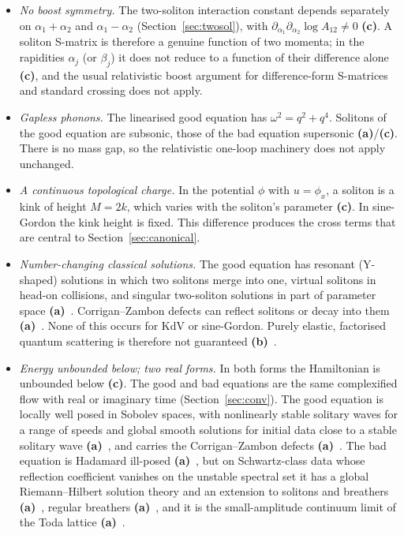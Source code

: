 \documentclass[11pt,a4paper]{article}
\newcommand{\lab}[1]{{\normalfont\sffamily\footnotesize\bfseries(#1)}}
\newcommand{\La}{\lab{a}}
\newcommand{\Lb}{\lab{b}}
\newcommand{\Lc}{\lab{c}}
\theoremstyle{remark}
\begin{document}
\begin{itemize}
\item \emph{No boost symmetry.} The two-soliton interaction constant depends separately on $\alpha_1+\alpha_2$ and $\alpha_1-\alpha_2$ (Section~\ref{sec:twosol}), with $\partial_{\alpha_1}\partial_{\alpha_2}\log A_{12}\neq0$ \Lc. A soliton S-matrix is therefore a genuine function of two momenta; in the rapidities $\alpha_j$ (or $\beta_j$) it does not reduce to a function of their difference alone \Lc, and the usual relativistic boost argument for difference-form S-matrices and standard crossing does not apply.
\item \emph{Gapless phonons.} The linearised good equation has $\omega^2=q^2+q^4$. Solitons of the good equation are subsonic, those of the bad equation supersonic \La/\Lc. There is no mass gap, so the relativistic one-loop machinery does not apply unchanged.
\item \emph{A continuous topological charge.} In the potential $\phi$ with $u=\phi_x$, a soliton is a kink of height $M=2k$, which varies with the soliton's parameter \Lc. In sine-Gordon the kink height is fixed. This difference produces the cross terms that are central to Section~\ref{sec:canonical}.
\item \emph{Number-changing classical solutions.} The good equation has resonant (Y-shaped) solutions in which two solitons merge into one, virtual solitons in head-on collisions, and singular two-soliton solutions in part of parameter space \La~\cite{HI,LMK,RS,DMHC}. Corrigan--Zambon defects can reflect solitons or decay into them \La~\cite{CZ}. None of this occurs for KdV or sine-Gordon. Purely elastic, factorised quantum scattering is therefore not guaranteed \Lb~\cite{CZ}.
\item \emph{Energy unbounded below; two real forms.} In both forms the Hamiltonian is unbounded below \Lc. The good and bad equations are the same complexified flow with real or imaginary time (Section~\ref{sec:conv}). The good equation is locally well posed in Sobolev spaces, with nonlinearly stable solitary waves for a range of speeds and global smooth solutions for initial data close to a stable solitary wave \La~\cite{BonaSachs}, and carries the Corrigan--Zambon defects \La~\cite{CZ}. The bad equation is Hadamard ill-posed \La~\cite{CL-WW}, but on Schwartz-class data whose reflection coefficient vanishes on the unstable spectral set it has a global Riemann--Hilbert solution theory and an extension to solitons and breathers \La~\cite{CL-WW,CL-SOL,CL-SR}, regular breathers \La~\cite{CL-SOL,BC}, and it is the small-amplitude continuum limit of the Toda lattice \La~\cite{Zak}.
\end{itemize}
\end{document}

